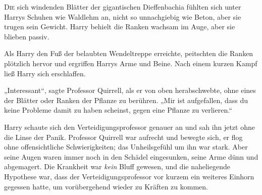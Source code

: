 
\lettrine{D}{ie} sich windenden Blätter der gigantischen Dieffenbachia fühlten sich unter Harrys Schuhen wie Waldlehm an, nicht so unnachgiebig wie Beton, aber sie trugen sein Gewicht. Harry behielt die Ranken wachsam im Auge, aber sie blieben passiv.

Als Harry den Fuß der belaubten Wendeltreppe erreichte, peitschten die Ranken plötzlich hervor und ergriffen Harrys Arme und Beine. Nach einem kurzen Kampf ließ Harry sich erschlaffen.

„Interessant“, sagte Professor Quirrell, als er von oben herabschwebte, ohne eines der Blätter oder Ranken der Pflanze zu berühren.
„Mir ist aufgefallen, dass du keine Probleme damit zu haben scheinst, gegen eine Pflanze zu verlieren.“

Harry schaute sich den Verteidigungsprofessor genauer an und sah ihn jetzt ohne die Linse der Panik. Professor Quirrell war aufrecht und bewegte sich, er flog ohne offensichtliche Schwierigkeiten; das Unheilsgefühl um ihn war stark. Aber seine Augen waren immer noch in den Schädel eingesunken, seine Arme dünn und abgemagert. Die Krankheit war \emph{kein} Bluff gewesen, und die naheliegende Hypothese war, dass der Verteidigungsprofessor vor kurzem ein weiteres Einhorn gegessen hatte, um vorübergehend wieder zu Kräften zu kommen.

